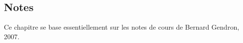 \begin{small}
\section{Notes}

Ce chapitre se base essentiellement sur les notes de cours de Bernard Gendron, 2007.

\end{small}
